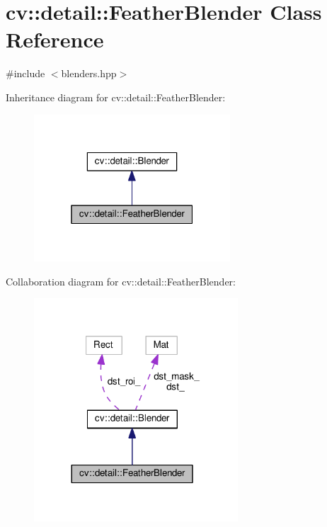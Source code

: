 \hypertarget{classcv_1_1detail_1_1FeatherBlender}{\section{cv\-:\-:detail\-:\-:Feather\-Blender Class Reference}
\label{classcv_1_1detail_1_1FeatherBlender}
}


{\ttfamily \#include $<$blenders.\-hpp$>$}



Inheritance diagram for cv\-:\-:detail\-:\-:Feather\-Blender\-:\nopagebreak
\begin{figure}[H]
\begin{center}
\leavevmode
\includegraphics[width=208pt]{classcv_1_1detail_1_1FeatherBlender__inherit__graph}
\end{center}
\end{figure}


Collaboration diagram for cv\-:\-:detail\-:\-:Feather\-Blender\-:\nopagebreak
\begin{figure}[H]
\begin{center}
\leavevmode
\includegraphics[width=216pt]{classcv_1_1detail_1_1FeatherBlender__coll__graph}
\end{center}
\end{figure}
